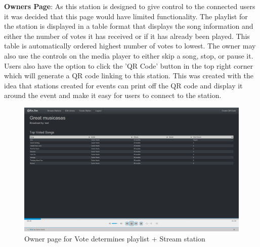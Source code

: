 \documentclass[a4paper, 12pt]{report}
\begin{document}
\textbf{Owners Page}: As this station is designed to give control to the connected users it was decided that this page would have limited functionality. The playlist for the station is displayed in a table format that displays the song information and either the number of votes it has received or if it has already been played. This table is automatically ordered highest number of votes to lowest. The owner may also use the controls on the media player to either skip a song, stop, or pause it. 
Users also have the option to click the 'QR Code' button in the top right corner which will generate a QR code linking to this station. This was created with the idea that stations created for events can print off the QR code and display it around the event and make it easy for users to connect to the station.
\begin{figure}[H]
  \centering
    \includegraphics[width=1.0\textwidth]{screenshots/station-type-1-owner.png}
    \caption{Owner page for Vote determines playlist + Stream station}
    \label{station-type-1-owner}
\end{figure}
\end{document}
